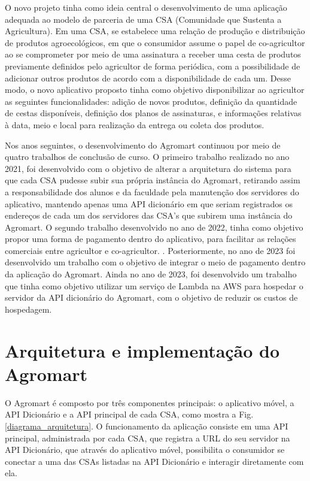 O novo projeto tinha como ideia central o desenvolvimento de uma aplicação adequada ao modelo de parceria de uma CSA (Comunidade que Sustenta a Agricultura). Em uma CSA, se estabelece uma relação de produção e distribuição de produtos agroecológicos, em que o consumidor assume o papel de co-agricultor ao se comprometer por meio de uma assinatura a receber uma cesta de produtos previamente definidos pelo agricultor de forma periódica, com a possibilidade de adicionar outros produtos de acordo com a disponibilidade de cada um. Desse modo, o novo aplicativo proposto tinha como objetivo disponibilizar ao agricultor as seguintes funcionalidades: adição de novos produtos, definição da quantidade de cestas disponíveis, definição dos planos de assinaturas, e informações relativas à data, meio e local para realização da entrega ou coleta dos produtos. \cite{rodriguesemacedo2021}

Nos anos seguintes, o desenvolvimento do Agromart continuou por meio de quatro trabalhos de conclusão de curso. O primeiro trabalho realizado no ano 2021, foi desenvolvido com o objetivo de alterar a arquitetura do sistema para que cada CSA pudesse subir sua própria instância do Agromart, retirando assim a responsabilidade dos alunos e da faculdade pela manutenção dos servidores do aplicativo, mantendo apenas uma API dicionário em que seriam registrados os endereços de cada um dos servidores das CSA’s que subirem uma instância do Agromart.\cite{cellaefreitas2023} O segundo trabalho desenvolvido no ano de 2022, tinha como objetivo propor uma forma de pagamento dentro  do aplicativo, para facilitar as relações comerciais entre agricultor e co-agricultor. \cite{correiaeveludo2022}. Posteriormente, no ano de 2023 foi desenvolvido um trabalho com o objetivo de integrar o meio de pagamento dentro da aplicação do Agromart.\cite{augustiniebotinno2023} Ainda no ano de 2023, foi desenvolvido um trabalho que tinha como objetivo utilizar um serviço de Lambda na AWS para hospedar o servidor da API dicionário do Agromart, com o objetivo de reduzir os custos de hospedagem. \cite{ribeiroemagalhoes2023}

\section{Arquitetura e implementação do Agromart}
O Agromart é composto por três componentes principais: o aplicativo móvel, a API Dicionário e a API principal de cada CSA, como mostra a Fig. \ref{diagrama_arquitetura}. O funcionamento da aplicação consiste em uma API principal, administrada por cada CSA, que registra a URL do seu servidor na API Dicionário, que através do aplicativo móvel, possibilita o consumidor se conectar a uma das CSAs listadas na API Dicionário e interagir diretamente com ela.

